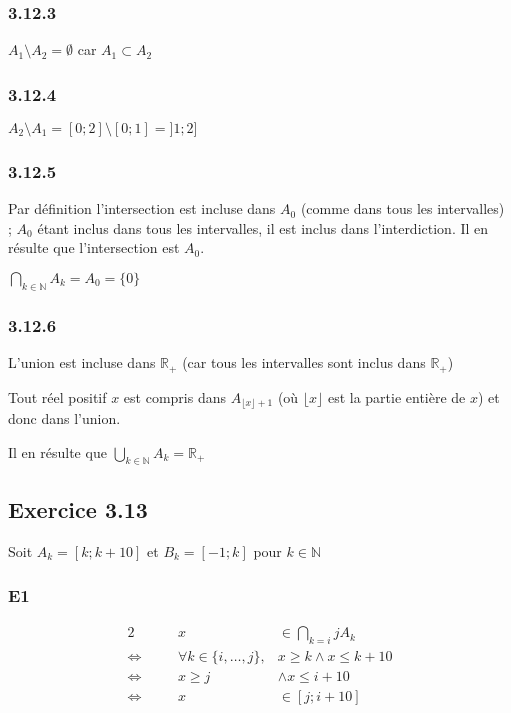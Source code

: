 \documentclass[a4paper,10pt]{report}
\begin{document}
\subsubsection*{3.12.3}
$A_1 \setminus A_2 = \emptyset$ car $A_1 \subset A_2$

\subsubsection*{3.12.4}
$A_2 \setminus A_1 = [0;2]\setminus [0;1] = ]1 ; 2]$

\subsubsection*{3.12.5}

Par définition l'intersection est incluse dans $A_0$ (comme dans tous les intervalles) ; $A_0$ étant inclus
dans tous les intervalles, il est inclus dans l'interdiction. Il en résulte que l'intersection est $A_0$.

$\bigcap_{k \in \mathbb{N}} A_k = A_0 = \{0\}$

\subsubsection*{3.12.6}

L'union est incluse dans $\mathbb{R}_+$ (car tous les intervalles sont inclus dans $\mathbb{R}_+$)

Tout réel positif $x$ est compris dans $A_{\lfloor x \rfloor + 1}$ (où $\lfloor x \rfloor$ est la partie entière de $x$) et
donc dans l'union.

Il en résulte que $\bigcup_{k \in \mathbb{N}} A_k = \mathbb{R}_+$ 


\subsection*{Exercice 3.13}

Soit $A_k = [k;k+10]$ et $B_k = [-1 ; k]$ pour $k \in \mathbb{N}$

\subsubsection*{E1}

\begin{alignat*}{2}
 	                    &\quad & x &\in \bigcap_{k=i}{j} A_k  \\
	\Longleftrightarrow &      & \forall k \in \{i,\ldots,j\},& x\geq k \wedge x \leq k+10  \\
	\Longleftrightarrow &      &  x\geq j &\wedge x \leq i+10 \\
	\Longleftrightarrow &      & x &\in [j ; i+10]           
\end{alignat*}
\end{document}
